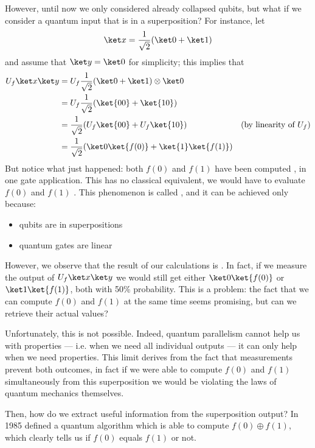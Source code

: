 \documentclass[a4paper, 12pt]{report}
\begin{document}
However, until now we only considered already collapsed qubits, but what if we consider a quantum input that is in a superposition? For instance, let $$\ket x = \dfrac{1}{\sqrt 2}(\ket 0 + \ket 1)$$ and assume that $\ket y = \ket 0$ for simplicity; this implies that
\begin{equation*}
    \begin{alignedat}{2}
        U_f \ket x \ket y & = U_f \dfrac{1}{\sqrt 2}(\ket 0 + \ket 1) \otimes \ket 0 & \\ 
                          & = U_f \dfrac{1}{\sqrt 2}(\ket{00} + \ket{10}) & \\ 
                          & = \dfrac{1}{\sqrt 2}(U_f \ket {00} + U_f \ket {10}) & \quad (\mbox{by linearity of $U_f$}) \\ 
                          & = \dfrac{1}{\sqrt 2}(\ket 0 \ket{f(0)} + \ket{1} \ket{f(1)}) & \\ 
    \end{alignedat}
\end{equation*}
But notice what just happened: both $f(0)$ and $f(1)$ have been computed , in one gate application. This has no classical equivalent, we would have to evaluate $f(0)$ and $f(1)$ . This phenomenon is called , and it can be achieved only because:

\begin{itemize}
    \item qubits are in superpositions
    \item quantum gates are linear
\end{itemize}

However, we observe that the result of our calculations is . In fact, if we measure the output of $U_f \ket x \ket y$ we would still get either $\ket 0 \ket{f(0)}$ or $\ket 1 \ket {f(1)}$, both with 50\% probability. This is a problem: the fact that we can compute $f(0)$ and $f(1)$ at the same time seems promising, but can we retrieve their actual values?

Unfortunately, this is not possible. Indeed, quantum parallelism cannot help us with  properties --- i.e. when we need all individual outputs --- it can only help when we need  properties. This limit derives from the fact that measurements prevent  both outcomes, in fact if we were able to compute $f(0)$ and $f(1)$ simultaneously from this superposition we would be violating the laws of quantum mechanics themselves.

Then, how do we extract useful  information from the superposition output? In 1985 \textcite{deutsch} defined a quantum algorithm which is able to compute $f(0) \oplus f(1)$, which clearly tells us if $f(0)$ equals $f(1)$ or not.


\printbibliography %
\end{document}
